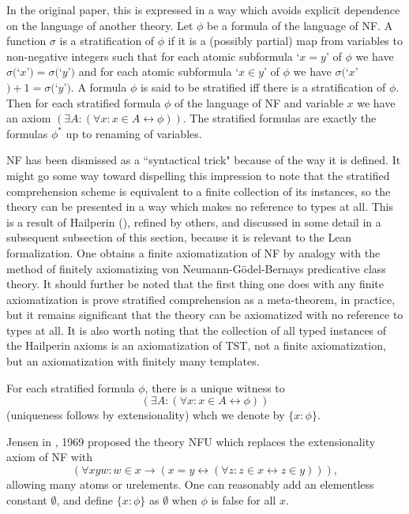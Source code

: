 \documentclass[112pt]{article}
\theoremstyle{definition}
\theoremstyle{remark}
\begin{document}
In the original paper, this is expressed in a way which avoids explicit dependence on the language of another theory.  Let $\phi$ be a formula of the language of
NF.  A function $\sigma$ is a stratification of $\phi$ if it is a (possibly partial) map from variables to non-negative integers such that for each atomic subformula
`$x=y$'  of $\phi$ we have $\sigma($`$x$'$)=\sigma($`$y$'$)$ and for each atomic subformula `$x \in y$' of $\phi$ we have $\sigma($`$x$'$)+1 = \sigma($`$y$'$)$.
A formula $\phi$ is said to be stratified iff there is a stratification of $\phi$.  Then for each stratified formula $\phi$ of the language of NF and variable $x$ we have an axiom $(\exists A:(\forall x:x \in A \leftrightarrow \phi))$.  The stratified formulas are exactly the formulas $\phi^*$ up to renaming of variables.

NF has been dismissed as a ``syntactical trick" because of the way it is defined.  It might go some way toward dispelling this impression to note that the stratified comprehension scheme is equivalent to a finite collection of its instances, so the theory can be presented in a way which makes no reference to types at all.  This is a result of Hailperin (\cite{hailperin}), refined by others, and discussed in some detail in a subsequent subsection of this section, because it is relevant to the Lean formalization.  One obtains a finite axiomatization of NF by analogy with the method of finitely axiomatizing von Neumann-G\"odel-Bernays predicative class theory.  It should further be noted that the first thing one does with any finite axiomatization is prove stratified comprehension as a meta-theorem, in practice, but it remains significant that the theory can be axiomatized with no reference to types at all.  It is also worth noting that the collection of all typed instances of the Hailperin axioms is an axiomatization of TST, not a finite axiomatization, but an axiomatization with finitely many templates.

For each stratified formula $\phi$, there is a unique witness to $$(\exists A:(\forall x:x \in A \leftrightarrow \phi))$$ (uniqueness follows by extensionality) whch we denote by $\{x:\phi\}$.

Jensen in \cite{nfu}, 1969 proposed the theory NFU which replaces the extensionality axiom of NF with $$(\forall xyw:w \in x \rightarrow (x=y \leftrightarrow (\forall z:z \in x \leftrightarrow z\in y))),$$  allowing many atoms or urelements.  One can reasonably add an elementless constant $\emptyset$, and define $\{x:\phi\}$ as $\emptyset$ when $\phi$ is false for all $x$.
\end{document}
